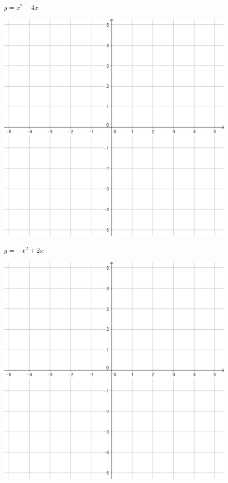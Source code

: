 \documentclass[a4paper]{oblivoir}
\begin{document}
\begin{minipage}{0.45\textwidth}\centering
\(y=x^2-4x\)
\par\bigskip\includegraphics[width=0.9\textwidth]{55}
\end{minipage}
\begin{minipage}{0.45\textwidth}\centering
\(y=-x^2+2x\)
\par\bigskip\includegraphics[width=0.9\textwidth]{55}
\end{minipage}\bigskip\bigskip\par
\end{document}
